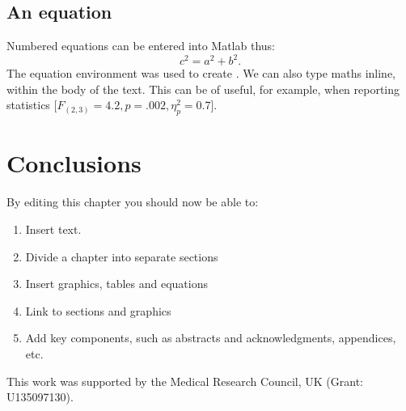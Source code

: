 \subsection{An equation}
Numbered equations can be entered into Matlab thus:
\begin{equation}
c^2 = a^2 + b^2 \textrm{.}
\label{eq:exampleEquation}
\end{equation}
The equation environment was used to create . We can also type maths inline, within the body of the text. This can be of useful, for example, when reporting statistics [$F_{(2,3)} = 4.2, p = .002, \eta^{2}_{p} = 0.7$].


\section{Conclusions}

By editing this chapter you should now be able to:
\begin{enumerate}[(1)]
\item Insert text.
\item Divide a chapter into separate sections
\item Insert graphics, tables and equations
\item Link to sections and graphics
\item Add key components, such as abstracts and acknowledgments, appendices, etc.
\end{enumerate}


\begin{chapacknowledgements}
This work was supported by the Medical Research Council, UK (Grant: U135097130).
\end{chapacknowledgements}


